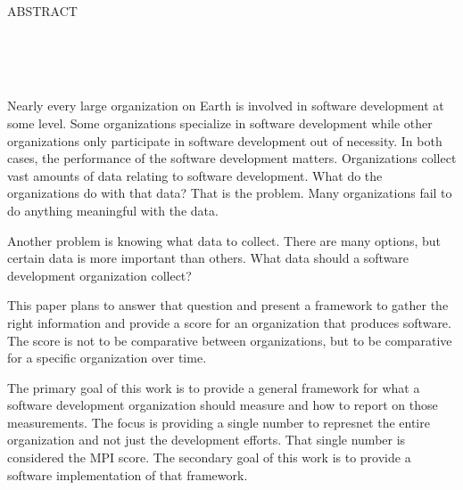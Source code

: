 \documentclass[SDSUThesis.tex]{subfiles}
\begin{document}
\newpage
\doublespacing

\begin{center}
ABSTRACT\\

\yourtitle \\
\yourname \\
\number\year\\
\end{center}

\par
Nearly every large organization on Earth is involved in software development at some level.  Some organizations
specialize in software development while other organizations only participate in software development out of
necessity. In both cases, the performance of the software development matters.  Organizations collect
vast amounts of data relating to software development.  What do the organizations do with that data? 
That is the problem.  Many organizations fail to do anything meaningful with the data.  

Another problem is knowing what data to collect.  There are many options, but certain data is more important than
others.  What data should a software development organization collect?

This paper plans to answer that question and present a framework to gather the 
right information and provide a score for an organization that
produces software.  The score is not to be comparative between organizations, but to be comparative for a specific
organization over time.  

The primary goal of this work is to provide a general framework for what a software development organization
should measure and how to report on those measurements.  The focus is providing a single number
to represnet the entire
organization and not just the development efforts.  That single number is considered the MPI score. The secondary goal of this work is to provide
a software implementation of that framework.
\end{document}
